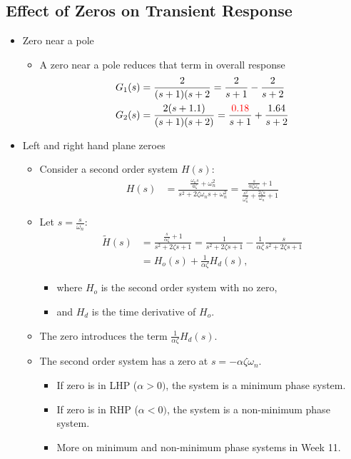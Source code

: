 \documentclass[a4paper]{article}
\begin{document}
\subsection{Effect of Zeros on Transient Response}
\begin{itemize}
    \item Zero near a pole
    \begin{itemize}[label=$\circ$]
        \item A zero near a pole reduces that term in overall response
        \begin{align*}
            G_1(s) &= \frac{2}{(s+1)(s+2} = \frac{2}{s+1}-\frac{2}{s+2}\\
            G_2(s) &= \frac{2(s+1.1)}{(s+1)(s+2)} = \frac{\textcolor{red}{0.18}}{s+1}+\frac{1.64}{s+2}
        \end{align*}
    \end{itemize}
    \item Left and right hand plane zeroes
    \begin{itemize}[label=$\circ$]
        \item Consider a second order system $H(s)$:
        \begin{align*}
            H(s) &= \frac{\frac{\omega_n s}{a\zeta}+\omega_n^2}{s^2+2\zeta\omega_n s+\omega_n^2} = \frac{\frac{s}{\alpha\zeta\omega_n}+1}{\frac{s^2}{\omega_n^2}+\frac{2\zeta s}{\omega_n}+1}
        \end{align*}
        \item Let $s = \displaystyle\frac{s}{\omega_n}$:
        \begin{align*}
            \widetilde{H}(s) &= \frac{\frac{s}{\alpha\zeta}+1}{s^2+2\zeta s+1} = \frac{1}{s^2+2\zeta s+1}-\frac{1}{\alpha\zeta}\frac{s}{s^2+2\zeta s+1}\\
            &= H_o(s) + \frac{1}{\alpha\zeta}H_d(s),
        \end{align*}
        \begin{itemize}[label=\tiny$\blacksquare$]
            \item where $H_o$ is the second order system with no zero,
            \item and $H_d$ is the time derivative of $H_o$.
        \end{itemize}
        \item The zero introduces the term $\displaystyle\frac{1}{\alpha\zeta}H_d(s)$.
        \item The second order system has a zero at $s = -\alpha\zeta\omega_n$.
        \begin{itemize}[label=\tiny$\blacksquare$]
            \item If zero is in LHP ($\alpha > 0)$, the system is a minimum phase system.
            \item If zero is in RHP ($\alpha < 0)$, the system is a non-minimum phase system.
            \item More on minimum and non-minimum phase systems in Week 11.
        \end{itemize}
    \end{itemize}
\end{itemize}
\end{document}
